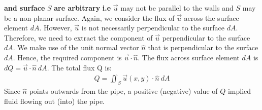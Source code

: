 \documentclass[11pt]{article}
\begin{document}
\begin{enumerate}
                        \textbf{and surface} $S$ \textbf{are arbitrary} \textbf{i.e} $\vec{u}$ may not be parallel to
                        the walls and $S$ may be a non-planar surface.
                        Again, we consider the flux of $\vec{u}$ across the surface element $dA$.
                        However, $\vec{u}$ is not necessarily perpendicular to the surface $dA$.
                        Therefore, we need to extract the component of $\vec{u}$ perpendicular to the surface $dA$.
                        We make use of the unit normal vector $\hat{n}$ that is perpendicular to the surface $dA$.
                        Hence, the required component is $\vec{u} \cdot \hat{n}$.
                        The flux across surface element $dA$ is $dQ = \vec{u} \cdot \hat{n} \: dA$.
                        The total flux Q is:
                        \begin{align}
                            Q = \iint_S \vec{u}(x,y) \cdot \hat{n} \: dA
                        \end{align}
                        Since $\hat{n}$ points outwards from the pipe, a positive (negative) value of $Q$ implied fluid flowing out
                        (into) the pipe.
                    \end{enumerate}
\end{document}
